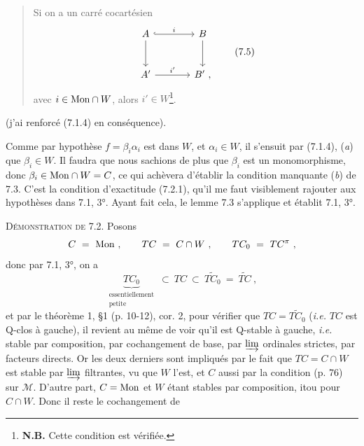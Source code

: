 \begin{quote}
Si on a un carré cocartésien
\[
\begin{tikzcd}[row sep=large, column sep=large]
A \arrow[r, hook, "i"] \arrow[d] & B \arrow[d] \\
A' \arrow[r, "{i'}"] & B' \ ,
\end{tikzcd}
\tag*{(7.5)}
\]
avec $i \in \mathrm{Mon} \cap W$, alors $i' \in W$\footnote[34]{\textbf{N.B.} Cette condition est vérifiée.}.
\end{quote}

(j'ai renforcé (7.1.4) en conséquence).


Comme par hypothèse $f = \beta_i \alpha_i$ est dans $W$, et $\alpha_i \in W$, il s'ensuit par (7.1.4), (\textit{a}) que $\beta_i \in W$. Il faudra que nous sachions de plus que $\beta_i$ est un monomorphisme, donc $\beta_i \in \mathrm{Mon} \cap W = C$, ce qui achèvera d'établir la condition manquante (\textit{b}) de 7.3. C'est la condition d'exactitude (7.2.1), qu'il me faut visiblement rajouter aux hypothèses dans 7.1, 3°. Ayant fait cela, le lemme 7.3 s'applique et établit 7.1, 3°.

\textsc{Démonstration de} 7.2. Posons
\[
C \ = \ \mathrm{Mon} \ , \qquad TC \ = \ C \cap W \ , \qquad TC_0 \ = \ TC^{\pi} \ ,
\]
donc par 7.1, 3°, on a
\[
\underbrace{TC_0}_{\substack{\text{essentiellement}\\ \text{petite}}} \ \subset \ TC \ \subset \ \widetilde{TC_0} \ = \ \widetilde{TC} \ ,
\]
et par le théorème 1, §1 (p. 10-12), cor. 2, pour vérifier que $TC = \widetilde{TC_0}$ (\textit{i.e.} $TC$ est Q-clos à gauche), il revient au même de voir qu'il est Q-stable à gauche, \textit{i.e.} stable par composition, par cochangement de base, par $\varinjlim$ ordinales strictes, par facteurs directs. Or les deux derniers sont impliqués par le fait que $TC = C \cap W$ est stable par $\varinjlim$ filtrantes, vu que $W$ l'est, et $C$ aussi par la condition  (p. 76) sur $\mathcal{M}$. D'autre part, $C = \mathrm{Mon}$ et $W$ étant stables par composition, itou pour $C \cap W$. Donc il reste le cochangement de


